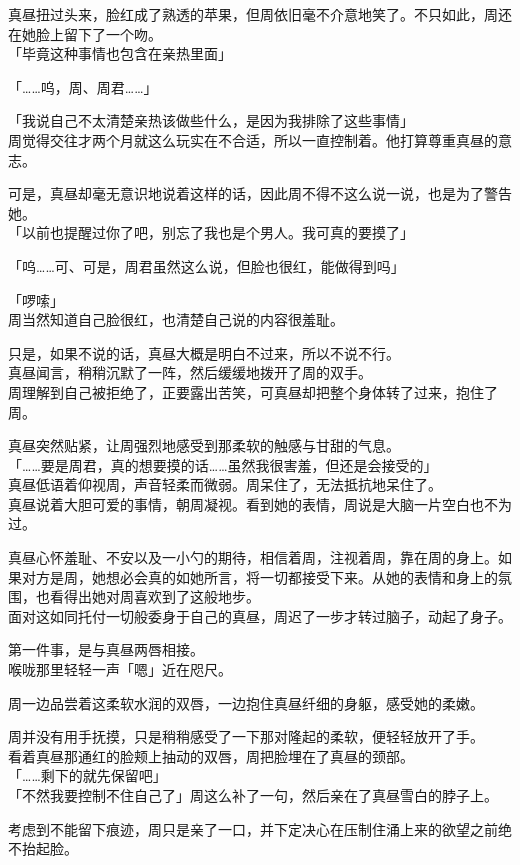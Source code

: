 真昼扭过头来，脸红成了熟透的苹果，但周依旧毫不介意地笑了。不只如此，周还在她脸上留下了一个吻。\\

「毕竟这种事情也包含在亲热里面」

「……呜，周、周君……」

「我说自己不太清楚亲热该做些什么，是因为我排除了这些事情」\\

周觉得交往才两个月就这么玩实在不合适，所以一直控制着。他打算尊重真昼的意志。

可是，真昼却毫无意识地说着这样的话，因此周不得不这么说一说，也是为了警告她。\\

「以前也提醒过你了吧，别忘了我也是个男人。我可真的要摸了」

「呜……可、可是，周君虽然这么说，但脸也很红，能做得到吗」

「啰嗦」\\

周当然知道自己脸很红，也清楚自己说的内容很羞耻。

只是，如果不说的话，真昼大概是明白不过来，所以不说不行。\\

真昼闻言，稍稍沉默了一阵，然后缓缓地拨开了周的双手。\\

周理解到自己被拒绝了，正要露出苦笑，可真昼却把整个身体转了过来，抱住了周。

真昼突然贴紧，让周强烈地感受到那柔软的触感与甘甜的气息。\\

「……要是周君，真的想要摸的话……虽然我很害羞，但还是会接受的」\\

真昼低语着仰视周，声音轻柔而微弱。周呆住了，无法抵抗地呆住了。\\

真昼说着大胆可爱的事情，朝周凝视。看到她的表情，周说是大脑一片空白也不为过。

真昼心怀羞耻、不安以及一小勺的期待，相信着周，注视着周，靠在周的身上。如果对方是周，她想必会真的如她所言，将一切都接受下来。从她的表情和身上的氛围，也看得出她对周喜欢到了这般地步。\\

面对这如同托付一切般委身于自己的真昼，周迟了一步才转过脑子，动起了身子。

第一件事，是与真昼两唇相接。\\

喉咙那里轻轻一声「嗯」近在咫尺。

周一边品尝着这柔软水润的双唇，一边抱住真昼纤细的身躯，感受她的柔嫩。

周并没有用手抚摸，只是稍稍感受了一下那对隆起的柔软，便轻轻放开了手。\\

看着真昼那通红的脸颊上抽动的双唇，周把脸埋在了真昼的颈部。\\

「……剩下的就先保留吧」\\

「不然我要控制不住自己了」周这么补了一句，然后亲在了真昼雪白的脖子上。

考虑到不能留下痕迹，周只是亲了一口，并下定决心在压制住涌上来的欲望之前绝不抬起脸。

